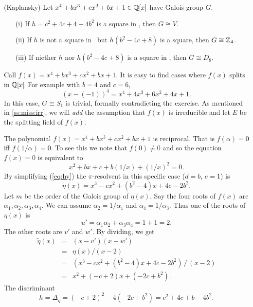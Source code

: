 \begin{myenumerate}
\item
\begin{excopy}
(Kaplansky)
\label{ex:Kaplansky:reciprocal}
Let \(x^4 + bx^3 + cx^2 + bx + 1 \in \mathbb{Q}[x]\)
have Galois group $G$.
\begin{itemize}
 \item[(i)]
   If \(h = c^2 + 4c + 4 - 4b^2\) is a square in \Q, then \(G \cong V\).
 \item[(ii)]
  If $h$ is not a square in \Q\ but \(h(b^2 - 4c + 8)\) is a square,
  then \(G \cong \mathbb{Z}_4\).
 \item[(iii)]
   If niether $h$ nor \(h(b^2 - 4c + 8)\) is a square in \Q,
   then \(G \cong D_8\).
\end{itemize}
\end{excopy}

Call \(f(x) = x^4 + bx^3 + cx^2 + bx + 1\).
It is easy to find cases where \(f(x)\) splits in \(\mathbb{Q}[x]\)
For example with \(b=4\) and \(c=6\),
\begin{equation*}
(x-(-1))^4 = x^4 + 4x^3 + 6x^2 + 4x + 1.
\end{equation*}
In this case, \(G \cong S_1\) is trivial, formally contradicting the exercise.
As mentioned in \ref{ss:miss:irr},
we will \emph{add} the assumption that \(f(x)\) is irreducible
and let $E$ be the splitting field of \(f(x)\).

The polynomial \(f(x) = x^4 + bx^3 + cx^2 + bx + 1\) 
is reciprocal. That is \(f(\alpha) = 0\) iff \(f(1/\alpha) = 0\).
To see this we note that \(f(0)\neq 0 \) and so the equation \(f(x)=0\)
is equivalent to
\begin{equation} \label{eq:recip}
 x^2 + bx + c + b(1/x) + (1/x)^2 = 0.
\end{equation}
By simplifying (\ref{eq:hy})
the \(\pi\)-resolvent in this specific case (\(d=b\), \(e=1\)) is
\begin{equation*}
\eta(x) =  x^3 - cx^2 + (b^2 - 4)x + 4c - 2b^2.
\end{equation*}
Let $m$ be the order of the Galois group of \(\eta(x)\).
Say the four roots of \(f(x)\) are \(\alpha_1,\alpha_2,\alpha_3,\alpha_4\).
We can assume 
\(\alpha_2 = 1/\alpha_1\) and
\(\alpha_4 = 1/\alpha_3\).
Thus one of the roots of \(\eta(x)\) is 
\begin{equation*}
u' = \alpha_1 \alpha_2 + \alpha_3 \alpha_4 = 1 + 1 = 2.
\end{equation*}
The other roots are $v'$ and $w'$.
By dividing, we get
\begin{eqnarray*}
\tilde{\eta}(x) 
 &=& (x-v')(x-w') \\
 &=& \eta(x)/(x-2) \\
 &=& \left(x^3 - cx^2 + (b^2 - 4)x + 4c - 2b^2\right)\,/\,(x-2)\\
 &=& x^2 + (-c + 2)x + (-2c + b^2).
\end{eqnarray*}
The discriminant 
\begin{equation*}
h = \Delta_{\tilde{\eta}} = (-c + 2)^2 - 4(-2c + b^2) = c^2 + 4c +b - 4b^2.
\end{equation*}


\end{myenumerate}
